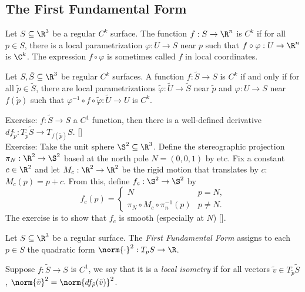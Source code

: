 \subsection{The First Fundamental Form}

\begin{definition}
    Let $S \subseteq \R^3$ be a regular $C^k$ surface. The function $f: S \to \R^n$ is $C^k$ if for all $p \in S$, there is a local parametrization $\varphi : U \to S$ near $p$ such that $f \circ \varphi : U \to \R^n$ is $\C^k$. The expression $f\circ \varphi$ is sometimes called $f$ in local coordinates.
\end{definition}

\begin{lemma}
    Let $S,\tilde{S} \subseteq \R^3$ be regular $C^k$ surfaces. A function $f : \tilde{S} \to S$ is $C^k$ if and only if for all $\tilde{p} \in \tilde{S}$, there are local parametrizations $\tilde{\varphi} : \tilde{U} \to \tilde{S}$ near $\tilde{p}$ and $\varphi : U \to S$ near $f(\tilde{p})$ such that $\varphi^{-1} \circ f \circ \tilde{\varphi} : \tilde{U} \to U$ is $C^k$.
\end{lemma}

\noindent Exercise: $f : \tilde{S} \to S$ a $C^1$ function, then there is a well-defined derivative $df_{\tilde{p}} : T_{\tilde{p}}\tilde{S} \to T_{f(\tilde{p})}S$. [\td]\\

\noindent Exercise: Take the unit sphere $\S^2 \subseteq \R^3$. Define the stereographic projection $\pi_N : \R^2 \to \S^2$ based at the north pole $N = (0,0,1)$ by etc. Fix a constant $c \in \R^2$ and let $M_c : \R^2 \to \R^2$ be the rigid motion that translates by $c$: $M_c(p) = p+c$. From this, define $f_c : \S^2 \to \S^2$ by
$$f_c(p) = \begin{cases}
    N & p=N,\\
    \pi_N\circ M_c \circ \pi_n^{-1}(p) & p \neq N.
\end{cases}$$
The exercise is to show that $f_c$ is smooth (especially at $N$) [\td].\\

\begin{definition}
    Let $S \subseteq \R^3$ be a regular surface. The \textit{First Fundamental Form} assigns to each $p \in S$ the quadratic form $\norm{\cdot}^2 : T_p S \to \R$.
\end{definition}

\begin{definition}
    Suppose $f : \tilde{S} \to S$ is $C^1$, we say that it is a \textit{local isometry} if for all vectors $\tilde{v} \in T_{\tilde{p}}\tilde{S}$, $\norm{\tilde{v}}^2 = \norm{df_{\tilde{p}}(\tilde{v})}^2$.
\end{definition}

